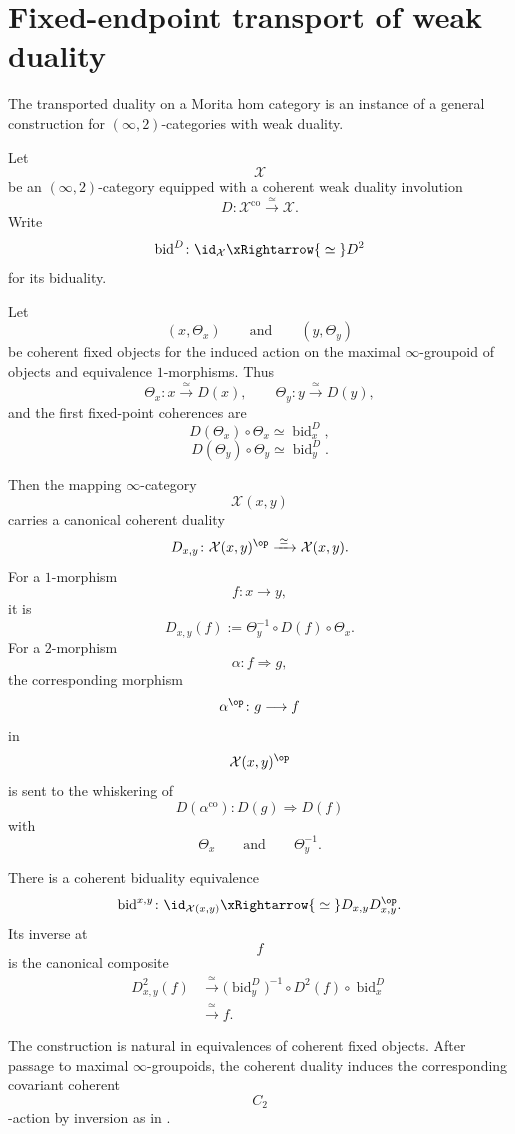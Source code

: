 \section{Fixed-endpoint transport of weak duality}
\label{sec:fixed-endpoint-transport}

The transported duality on a Morita hom category is an instance of a
general construction for $(\infty,2)$-categories with weak duality.

\begin{proposition}
\label{prop:fixed-endpoint-transport}
Let
\[
    \mathcal X
\]
be an $(\infty,2)$-category equipped with a coherent weak duality
involution
\[
    D
    \colon
    \mathcal X^{\mathrm{co}}
    \xrightarrow{\;\simeq\;}
    \mathcal X.
\]
Write
\[
    \operatorname{bid}^{D}
    \colon
    \id_{\mathcal X}
    \xRightarrow{\;\simeq\;}
    D^2
\]
for its biduality.

Let
\[
    (x,\Theta_x)
    \qquad\text{and}\qquad
    (y,\Theta_y)
\]
be coherent fixed objects for the induced action on the maximal
$\infty$-groupoid of objects and equivalence $1$-morphisms. Thus
\[
    \Theta_x
    \colon
    x
    \xrightarrow{\;\simeq\;}
    D(x),
    \qquad
    \Theta_y
    \colon
    y
    \xrightarrow{\;\simeq\;}
    D(y),
\]
and the first fixed-point coherences are
\[
    D(\Theta_x)\circ\Theta_x
    \simeq
    \operatorname{bid}^{D}_x,
\]
\[
    D(\Theta_y)\circ\Theta_y
    \simeq
    \operatorname{bid}^{D}_y.
\]

Then the mapping $\infty$-category
\[
    \mathcal X(x,y)
\]
carries a canonical coherent duality
\[
    D_{x,y}
    \colon
    \mathcal X(x,y)^{\op}
    \xrightarrow{\;\simeq\;}
    \mathcal X(x,y).
\]
For a $1$-morphism
\[
    f
    \colon
    x
    \longrightarrow
    y,
\]
it is
\[
    D_{x,y}(f)
    :=
    \Theta_y^{-1}
    \circ
    D(f)
    \circ
    \Theta_x.
\]
For a $2$-morphism
\[
    \alpha
    \colon
    f
    \Longrightarrow
    g,
\]
the corresponding morphism
\[
    \alpha^{\op}
    \colon
    g
    \longrightarrow
    f
\]
in
\[
    \mathcal X(x,y)^{\op}
\]
is sent to the whiskering of
\[
    D(\alpha^{\mathrm{co}})
    \colon
    D(g)
    \Longrightarrow
    D(f)
\]
with
\[
    \Theta_x
    \qquad\text{and}\qquad
    \Theta_y^{-1}.
\]

There is a coherent biduality equivalence
\[
    \operatorname{bid}^{x,y}
    \colon
    \id_{\mathcal X(x,y)}
    \xRightarrow{\;\simeq\;}
    D_{x,y}D_{x,y}^{\op}.
\]
Its inverse at
\[
    f
\]
is the canonical composite
\[
\begin{aligned}
    D_{x,y}^2(f)
    &\xrightarrow{\;\simeq\;}
    \bigl(
        \operatorname{bid}^{D}_y
    \bigr)^{-1}
    \circ
    D^2(f)
    \circ
    \operatorname{bid}^{D}_x
    \\
    &\xrightarrow{\;\simeq\;}
    f.
\end{aligned}
\]

The construction is natural in equivalences of coherent fixed objects.
After passage to maximal $\infty$-groupoids, the coherent duality induces
the corresponding covariant coherent
\[
    C_2
\]
-action by inversion as in
.
\end{proposition}

